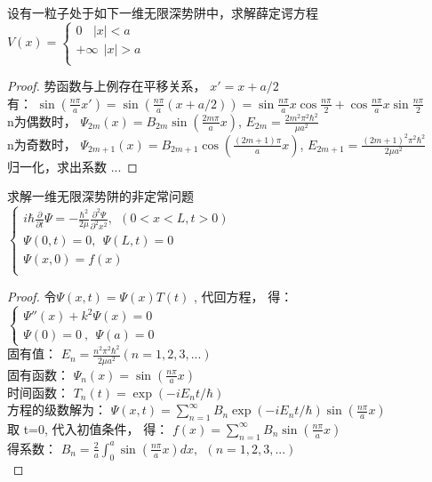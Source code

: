 \begin{example} %
	设有一粒子处于如下一维无限深势阱中，求解薛定谔方程\\
	{ $ \displaystyle 
		V(x)=\left \{ 
		\begin{array}{cccc}
			0	~~ ~~ |x|<a \\  
			+\infty ~~|x|>a\\
		\end{array}
		\right.
		$} \\
\end{example}
\begin{proof}	
势函数与上例存在平移关系， $x' =x+a/2$\\
有：  $  \sin(\frac{n\pi}{a}x') =\sin(\frac{n\pi}{a} (x+a/2)) =\sin \frac{n\pi}{a} x \cos \frac{n\pi}{2} + \cos \frac{n\pi}{a} x \sin \frac{n\pi}{2}  $ \\ 
n为偶数时， $ \Psi_{2m}(x)= B_{2m} \sin(\frac{2m\pi}{a}x) $,  $E_{2m} = \frac{2m^2\pi^2\hbar^2}{\mu a^2} $ \\
n为奇数时， $ \Psi_{2m+1}(x)= B_{2m+1} \cos(\frac{(2m+1)\pi}{a}x) $,  $E_{2m+1} = \frac{(2m+1)^2\pi^2\hbar^2}{2\mu a^2} $ \\
归一化，求出系数 ... 
\end{proof}	

\begin{example} %
求解一维无限深势阱的非定常问题 \\
{ $ \displaystyle 
\begin{cases}
i\hbar \frac{\partial }{\partial t} \Psi = -\frac{\hbar^2}{2\mu } \frac{\partial ^2 \Psi }{\partial ^2  x ^2 } , ~~ (0<x<L, t>0) \\
\Psi (0,t) =0, ~~ \Psi (L,t) =0 \\
\Psi (x,0) =f(x)  \\
\end{cases}
$} \\
\end{example}
\begin{proof}	
令$\Psi (x,t) =\Psi (x) T(t) $ ,  代回方程， 得：\\
{ $ \displaystyle 
	\begin{cases}
		\Psi''(x) + k^2	\Psi(x)=0  \\
		\Psi(0)=0~,~~ \Psi(a)=0 ~~~~~
	\end{cases}
	$} \\
固有值：{ $E_n = \frac{n^2\pi^2\hbar^2}{2\mu a^2} (n=1,2,3,...)$}\\
固有函数： $ \Psi_n(x) = \sin(\frac{n\pi}{a}x) $ 	 \\ 
时间函数： $T_n(t)  = \exp(-i E_n t /\hbar) $ \\
方程的级数解为：  $ \Psi(x,t)  = \sum_{n=1}^{\infty}  B_n \exp(-i E_n t /\hbar)  \sin(\frac{n\pi}{a}x)  $ \\
取 t=0, 代入初值条件， 得：  $ f(x)= \sum_{n=1}^{\infty}  B_n \sin(\frac{n\pi}{a}x)  $ \\
得系数：  $ B_n= \frac{2}{a} \int_{0} ^{a}  \sin(\frac{n\pi}{a}x) dx, ~~ (n=1,2,3,...) $ \\
\end{proof}	

